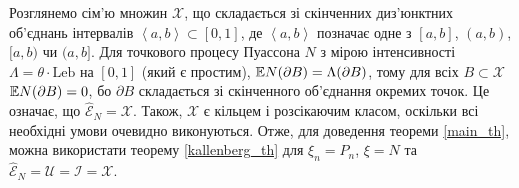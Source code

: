 Розглянемо сім'ю  множин $\mathcal{X}$, що складається зі
скінченних диз'юнктних об'єднань інтервалів $\left<a,b\right> \subset [0, 1]$,
де $\left<a,b\right>$ позначає одне з $[a, b]$, $(a, b)$, $[a, b)$ чи $(a, b]$.
Для точкового процесу Пуассона $N$
з мірою інтенсивності $\Lambda = \theta \cdot \mathrm{Leb}$ на $[0, 1]$ 
(який є простим),
$\mathbb{E} N(\partial B) = \Lambda (\partial B)$, тому 
для всіх $B \subset \mathcal{X}$ $\mathbb{E} N(\partial B) = 0$, бо
$\partial B$ складається зі скінченного об'єднання окремих точок.
Це означає, що $\hat{\mathcal{E}}_N = \mathcal{X}$.
Також, $\mathcal{X}$ є кільцем і розсікаючим класом, оскільки всі необхідні
умови очевидно виконуються.
Отже, для доведення теореми \ref{main_th}, можна використати теорему
\ref{kallenberg_th}
для $\xi_n = P_n$, $\xi = N$ та
$\hat{\mathcal{E}}_N = \mathcal{U} = \mathcal{I} = \mathcal{X}$.

